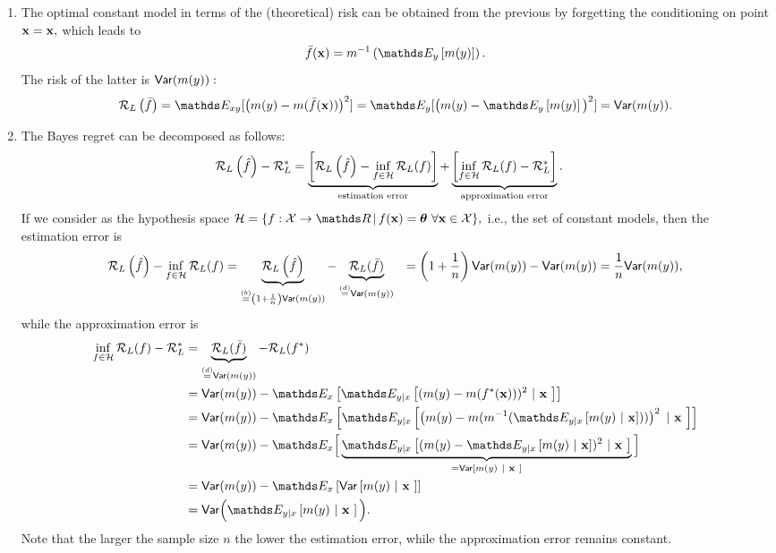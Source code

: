 \documentclass[a4paper]{article}
\begin{document}
{\begin{enumerate}
%
Using an $m$ corresponding to another notion of mean (e.g., harmonic or geometric mean), the best point-wise prediction for that other mean is obtained in each case.
%
\item The optimal constant model in terms of the (theoretical) risk can be obtained from the previous by forgetting the conditioning on point $\mathbf{x} = \mathbf{x},$ which leads to 
%
	$$
	\bar{f}(\xv) =   m^{-1} \left(  \E_{y }\left[ m(y)  \right] \right).
	$$
% 
	The risk of the latter is $\mathsf{Var}(m(y)):$
%	
	\begin{align*}
%		
		\risk_L\left(\bar{f} \right) 
		=  \E_{xy} [ \big(m(y)-m( \bar{f}(\xv) )\big)^2 ]  
		= \E_{y} [ \big(m(y)-  \E_{y }\left[ m(y)  \right] \big)^2 ] = \var(m(y)).  
%		
	\end{align*}
%	
%
\item The Bayes regret can be decomposed as follows: 
%
\begin{align*}
%	
	\risk_L\left(\hat f\right) - \riskbayes_{L} 
%	
	&= \underbrace{\left[\risk_L\left(\hat f\right) - \inf_{f \in \Hspace} \risk_L(f)\right]}_{\text{estimation error}} + \underbrace{\left[\inf_{f \in \Hspace} \risk_L(f) - \riskbayes_{L}\right]}_{\text{approximation error}}.
%	
\end{align*}
%
If we consider as the hypothesis space
%
$\Hspace = \{ f:\Xspace \to \R \, | \,  \fx = \bm{\theta}  \ \forall \xv \in \Xspace  \},$ i.e.,  the set of constant models, then the estimation error is
%
\begin{align*}
	\risk_L\left(\hat f\right) - \inf_{f \in \Hspace} \risk_L(f)
	&= \underbrace{\risk_L\left(\hat f\right)}_{ \overset{(b)}{=} \left( 1 + \frac1n \right) \var(m(y))} -  \underbrace{\risk_L(\bar{f})}_{\overset{(d)}{=} \var(m(y))}
%	
	&= \left( 1 + \frac1n \right) \var(m(y)) - \var(m(y)) = \frac1n  \var(m(y)),
\end{align*}
%
while the approximation error is
%
%
\begin{align*}
	\inf_{f \in \Hspace} \risk_L(f) - \riskbayes_{L}
	&=  \underbrace{\risk_L(\bar{f})}_{\overset{(d)}{=} \var(m(y))} - \risk_L(\fbayes) \\
	&=   \var(m(y))  -  \E_x
	\left[\E_{y|x}\left[(m(y)- m(  \fxbayes ))^2~|~ \xv ~ \right]\right]  \\
%	
	&= \var(m(y))  -  \E_x
	\left[\E_{y|x}\left[ \left(m(y)- m( m^{-1} (  \E_{y|x}\left[ m(y) ~|~ \xv \right] ) )\right)^2~|~ \xv~ \right]\right]  \\
%	
	&= \var(m(y))  -  \E_x \Big[
	\underbrace{\E_{y|x} \left[(m(y)-  \E_{y|x}\left[ m(y) ~|~ \xv \right]  )^2~|~ \xv ~ \right]}_{ = \var\left[ m(y) ~|~ \xv ~ \right]  } \Big]  \\
	&= \var(m(y))  -  \E_x
	\left[  \var\left[ m(y) ~|~ \xv ~ \right] \right]    \\
%	
	&= \var\Big(  \E_{y|x}\left[ m(y) ~|~ \xv ~ \right] \Big).
\end{align*}
%
Note that the larger the sample size $n$ the lower the estimation error, while the approximation error remains constant.
%

\end{enumerate}
}
\end{document}
